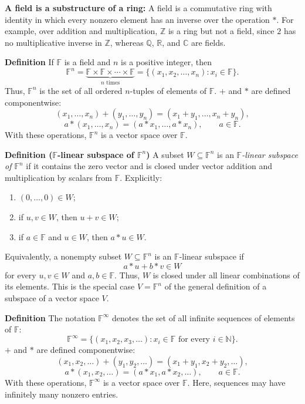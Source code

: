 \documentclass[a4paper,11pt,abstract=true]{scrartcl}
\theoremstyle{dotlessP}
\theoremstyle{dotlessS}
\theoremstyle{remark}
\theoremstyle{definition}
\begin{document}
\begin{remark_box}
\textbf{A field is a substructure of a ring:} A field is a commutative
ring with identity in which every nonzero element has an inverse over the operation $*$.
For example, over addition and multiplication, $\mathbb{Z}$ is a ring but not a field, since $2$ has no
multiplicative inverse in $\mathbb{Z}$, whereas $\mathbb{Q}$, $\mathbb{R}$,
and $\mathbb{C}$ are fields.
\end{remark_box}

\textbf{Definition} If $\mathbb{F}$ is a field and $n$ is a positive integer, then
\[
\mathbb{F}^n=\underbrace{\mathbb{F}\times \mathbb{F}\times\cdots\times \mathbb{F}}_{n\text{ times}}
=\{(x_1,x_2,\ldots,x_n):x_i\in \mathbb{F}\}.
\]
Thus, $\mathbb{F}^n$ is the set of all ordered $n$-tuples of elements of $\mathbb{F}$. $+$
and $*$ are defined componentwise:
\[
(x_1,\ldots,x_n)+(y_1,\ldots,y_n)
=(x_1+y_1,\ldots,x_n+y_n),
\]
\[
a*(x_1,\ldots,x_n)=(a*x_1,\ldots,a*x_n), \qquad a\in \mathbb{F}.
\]
With these operations, $\mathbb{F}^n$ is a vector space over $\mathbb{F}$.

\begin{definition_box}
\textbf{Definition ($\mathbb{F}$-linear subspace of $\mathbb{F}^n$)} A subset
$W\subseteq \mathbb{F}^n$ is an \emph{$\mathbb{F}$-linear subspace of $\mathbb{F}^n$} if it contains the
zero vector and is closed under vector addition and multiplication by scalars
from $\mathbb{F}$. Explicitly:
\begin{enumerate}
    \item $(0,\ldots,0)\in W$;
    \item if $u,v\in W$, then $u+v\in W$;
    \item if $a\in \mathbb{F}$ and $u\in W$, then $a*u\in W$.
\end{enumerate}
Equivalently, a nonempty subset $W\subseteq \mathbb{F}^n$ is an $\mathbb{F}$-linear subspace if
\[
a*u+b*v\in W
\]
for every $u,v\in W$ and $a,b\in \mathbb{F}$. Thus, $W$ is closed under all linear
combinations of its elements. This is the special case $V=\mathbb{F}^n$ of the general
definition of a subspace of a vector space $V$.
\end{definition_box}

\textbf{Definition} The notation $\mathbb{F}^\infty$ denotes the set of all infinite
sequences of elements of $\mathbb{F}$:
\[
\mathbb{F}^\infty=\{(x_1,x_2,x_3,\ldots):x_i\in \mathbb{F}\text{ for every }i\in\mathbb{N}\}.
\]
$+$ and $*$ are defined componentwise:
\[
(x_1,x_2,\ldots)+(y_1,y_2,\ldots)
=(x_1+y_1,x_2+y_2,\ldots),
\]
\[
a*(x_1,x_2,\ldots)=(a*x_1,a*x_2,\ldots), \qquad a\in \mathbb{F}.
\]
With these operations, $\mathbb{F}^\infty$ is a vector space over $\mathbb{F}$. Here, sequences
may have infinitely many nonzero entries.
\end{document}
